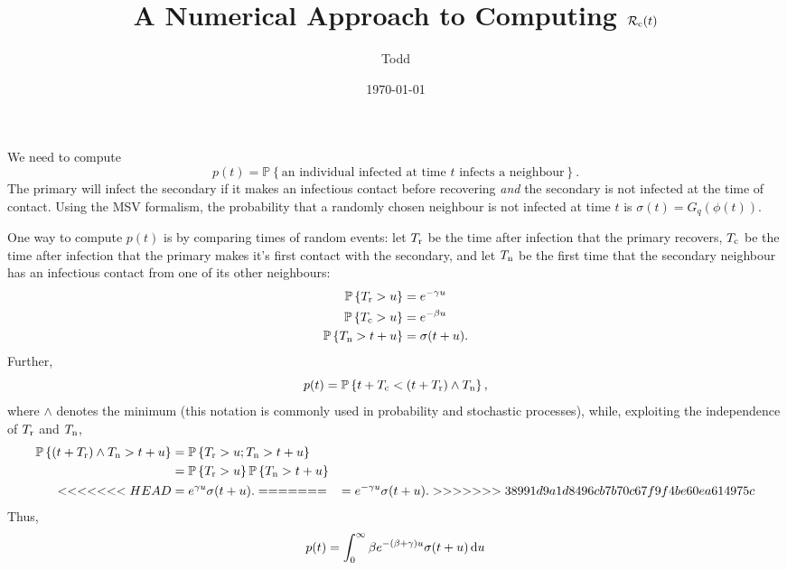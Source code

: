 \documentclass[11pt]{article}
\newcommand{\R}{\mathcal{R}}
\newcommand{\Rc}{\R_{\rm c}}
\newcommand{\Prob}[1]{\mathbb{P}\left\{#1\right\}}
\newcommand{\Tr}{T_{\rm r}}
\newcommand{\Tc}{T_{\rm c}}
\newcommand{\Tn}{T_{\rm n}}
\newcommand{\dee}{{\rm d}}
\begin{document}
\title{A Numerical Approach to Computing $\Rc(t)$}
\author{Todd}
\date{\today}
\maketitle

We need to compute 
\begin{equation}
	p(t) = \Prob{\text{an individual infected at time $t$ infects a neighbour}}.
\end{equation}
The primary will infect the secondary if it makes an infectious contact before recovering \emph{and} the secondary is not infected at the time of contact.  Using the MSV formalism, the probability that a randomly chosen neighbour is not infected at time $t$ is $\sigma(t) = G_{q}(\phi(t))$.

One way to compute $p(t)$ is by comparing times of random events: let $\Tr$ be the time after infection that the primary recovers, $\Tc$ be the time after infection that the primary makes it's first contact with the secondary, and let $\Tn$ be the first time that the secondary neighbour has an infectious contact from one of its other neighbours:
\begin{subequations}
\begin{align}
	\Prob{\Tr > u} &= e^{-\gamma u}\\
	\Prob{\Tc > u} &= e^{-\beta u}\\
	\Prob{\Tn > t+u} &= \sigma(t+u).
\end{align}
\end{subequations}
Further, 
 \begin{equation}
 	p(t) = \Prob{t+\Tc < (t+\Tr) \wedge \Tn},
\end{equation}
where $\wedge$ denotes the minimum (this notation is commonly used in probability and stochastic processes), while, exploiting the independence of $\Tr$ and $\Tn$,
\begin{subequations}
\begin{align}	
	\Prob{(t+\Tr) \wedge \Tn > t+u} &= \Prob{\Tr > u; \Tn > t+u}\\
	 &=  \Prob{\Tr > u}\Prob{\Tn > t+u}\\
<<<<<<< HEAD
	&= e^{\gamma u} \sigma(t+u).
=======
	&= e^{-\gamma u} \sigma(t+u).
>>>>>>> 38991d9a1d8496cb7b70c67f9f4be60ea614975c
\end{align}
\end{subequations}
Thus, 
\begin{equation}\label{eq:p.t.integral}
	p(t) = \int_{0}^{\infty} \beta e^{-(\beta+\gamma)u} \sigma(t+u)\, \dee u
\end{equation}
\end{document}

